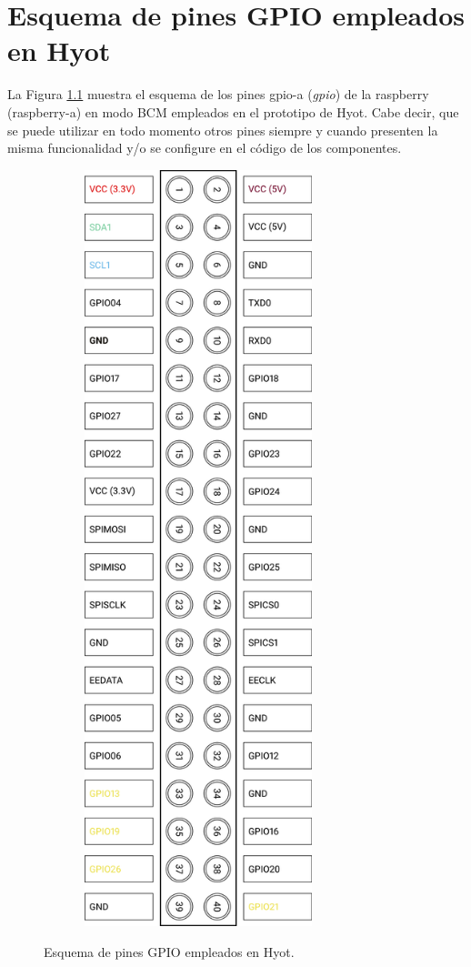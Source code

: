 \documentclass[12pt,a4paper, twoside]{report}
\begin{document}
	\chapter{Esquema de pines GPIO empleados en Hyot}\label{prototypeGPIO}
	
	La Figura \ref{fig:annexe_prototypeGPIO} muestra el esquema de los pines \gls{gpio-a} (\textit{\gls{gpio}}) de la \gls{raspberry} (\gls{raspberry-a}) en modo BCM \cite{pinout:rpi} empleados en el \gls{prototipo} de Hyot. Cabe decir, que se puede utilizar en todo momento otros pines siempre y cuando presenten la misma funcionalidad y/o se configure en el código de los componentes.
	
		\begin{figure}[!ht]   
			\caption{Esquema de pines GPIO empleados en Hyot.} 
			\begin{center} 
		 		\includegraphics[width=9cm,height=22cm]{Images/prototype/prototypeGPIO} \\
				\label{fig:annexe_prototypeGPIO} 
			\end{center}  
		\end{figure} 
		
\end{document}
